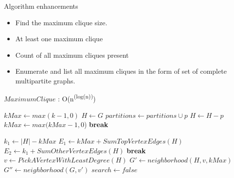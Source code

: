 \documentclass[landscape]{slides}
\begin{document}
\begin{slide}
	\begin{center}
		Algorithm enhancements
	\end{center}
	\begin{itemize}
		\setlength{\itemsep}{0pt}
		\setlength{\parskip}{20pt}
		\setlength{\parsep}{0pt}
		\item Find the maximum clique size. 
		\item At least one maximum clique
		\item Count of all maximum cliques present
		\item Enumerate and list all maximum cliques in the form of set of complete multipartite graphs.
	\end{itemize}
\end{slide}


\begin{algorithm}
	\caption{$MaximumClique$ : O(n\textsuperscript{(log(n))})}
	\begin{algorithmic}[1]
		\State $kMax \gets max(k - 1, 0)$
		\State $H \gets G$
		\State $partitions \gets partitions \cup p$
		\State $H \gets H - p$
		\State $kMax \gets max(kMax - 1, 0$)
		\EndWhile
		\State
			{\color{red} 
				\State {}
			\EndIf }
			\State \textbf{break}
		\EndIf
		\State
	\end{algorithmic}
\end{algorithm}


\begin{algorithm}
	\begin{algorithmic}[1]
		\State $k_1 \gets |H|-kMax$
		\State $E_1 \gets kMax + SumTopVertexEdges(H)$
		\State $E_2 \gets k_1 + SumOtherVertexEdges(H)$
		\State \textbf{break}
		\EndIf
		\EndIf
		\State
		\State $v \gets PickAVertexWithLeastDegree(H)$
		\State $G' \gets neighborhood(H, v, kMax)$
		\State $G'' \gets neighborhood(G, v')$
		\State $search \gets false$
		\EndIf
		\EndFor
	\end{algorithmic}
\end{algorithm}
\end{document}
